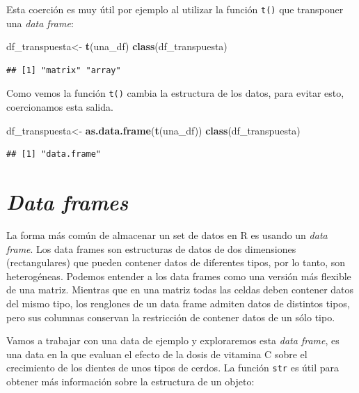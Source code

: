 \documentclass[
]{book}
\newenvironment{Shaded}{\begin{snugshade}}{\end{snugshade}}
\newcommand{\FunctionTok}[1]{\textcolor[rgb]{0.13,0.29,0.53}{\textbf{#1}}}
\newcommand{\NormalTok}[1]{#1}
\newcommand{\OtherTok}[1]{\textcolor[rgb]{0.56,0.35,0.01}{#1}}
\begin{document}
Esta coerción es muy útil por ejemplo al utilizar la función \texttt{t()} que transponer una \emph{data frame}:

\begin{Shaded}
\begin{Highlighting}[]
\NormalTok{df\_transpuesta}\OtherTok{\textless{}{-}} \FunctionTok{t}\NormalTok{(una\_df)}
\FunctionTok{class}\NormalTok{(df\_transpuesta)}
\end{Highlighting}
\end{Shaded}

\begin{verbatim}
## [1] "matrix" "array"
\end{verbatim}

Como vemos la función \texttt{t()} cambia la estructura de los datos, para evitar esto, coercionamos esta salida.

\begin{Shaded}
\begin{Highlighting}[]
\NormalTok{df\_transpuesta}\OtherTok{\textless{}{-}} \FunctionTok{as.data.frame}\NormalTok{(}\FunctionTok{t}\NormalTok{(una\_df))}
\FunctionTok{class}\NormalTok{(df\_transpuesta)}
\end{Highlighting}
\end{Shaded}

\begin{verbatim}
## [1] "data.frame"
\end{verbatim}

\section{\texorpdfstring{\emph{Data frames}}{Data frames}}\label{data-frames}

La forma más común de almacenar un set de datos en R es usando un \emph{data frame}.
Los data frames son estructuras de datos de dos dimensiones (rectangulares) que pueden contener datos de diferentes tipos, por lo tanto, son heterogéneas.
Podemos entender a los data frames como una versión más flexible de una matriz.
Mientras que en una matriz todas las celdas deben contener datos del mismo tipo, los renglones de un data frame admiten datos de distintos tipos, pero sus columnas conservan la restricción de contener datos de un sólo tipo.

Vamos a trabajar con una data de ejemplo y exploraremos esta \emph{data frame}, es una data en la que evaluan el efecto de la dosis de vitamina C sobre el crecimiento de los dientes de unos tipos de cerdos.
La función \texttt{str} es útil para obtener más información sobre la estructura de un objeto:
\end{document}
